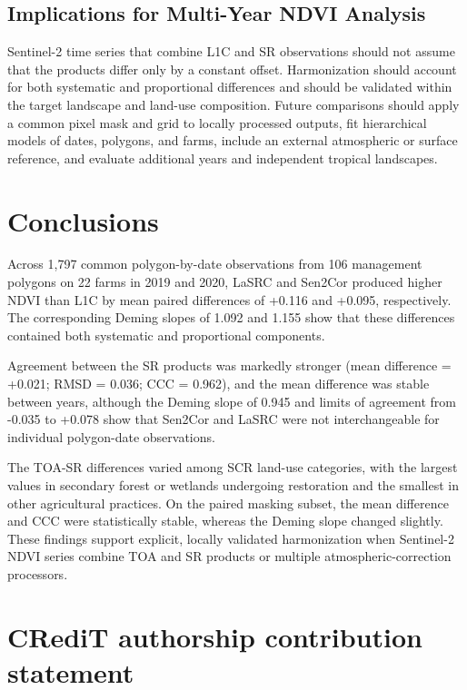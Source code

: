 \documentclass[
  authoryear,
  preprint]{elsarticle}
\begin{document}
\subsection{Implications for Multi-Year NDVI
Analysis}\label{sec-outlook}

Sentinel-2 time series that combine L1C and SR observations should not
assume that the products differ only by a constant offset. Harmonization
should account for both systematic and proportional differences and
should be validated within the target landscape and land-use
composition. Future comparisons should apply a common pixel mask and
grid to locally processed outputs, fit hierarchical models of dates,
polygons, and farms, include an external atmospheric or surface
reference, and evaluate additional years and independent tropical
landscapes.

\section{Conclusions}\label{sec-conclusions}

Across 1,797 common polygon-by-date observations from 106 management
polygons on 22 farms in 2019 and 2020, LaSRC and Sen2Cor produced higher
NDVI than L1C by mean paired differences of +0.116 and +0.095,
respectively. The corresponding Deming slopes of 1.092 and 1.155 show
that these differences contained both systematic and proportional
components.

Agreement between the SR products was markedly stronger (mean difference
= +0.021; RMSD = 0.036; CCC = 0.962), and the mean difference was stable
between years, although the Deming slope of 0.945 and limits of
agreement from -0.035 to +0.078 show that Sen2Cor and LaSRC were not
interchangeable for individual polygon-date observations.

The TOA-SR differences varied among SCR land-use categories, with the
largest values in secondary forest or wetlands undergoing restoration
and the smallest in other agricultural practices. On the paired masking
subset, the mean difference and CCC were statistically stable, whereas
the Deming slope changed slightly. These findings support explicit,
locally validated harmonization when Sentinel-2 NDVI series combine TOA
and SR products or multiple atmospheric-correction processors.

\section*{CRediT authorship contribution
statement}\label{credit-authorship-contribution-statement}
\end{document}
